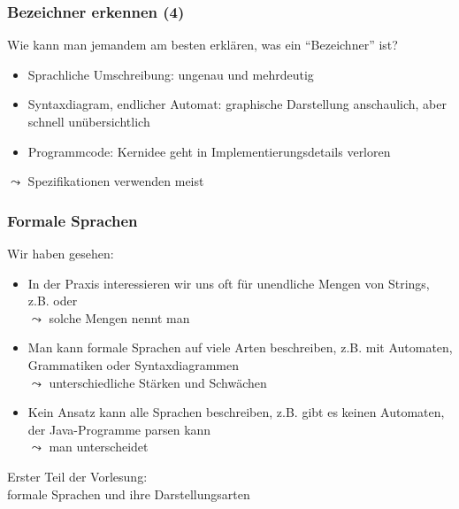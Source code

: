 \documentclass[onlymath]{beamer}
\begin{document}
\begin{frame}\frametitle{Bezeichner erkennen (4)}

Wie kann man jemandem am besten erklären, was ein "`Bezeichner"' ist?
\begin{itemize}
\item \alert{Sprachliche Umschreibung}: ungenau und mehrdeutig
\item \alert{Syntaxdiagram}, \alert{endlicher Automat}: graphische Darstellung anschaulich, aber schnell unübersichtlich
\item \alert{Programmcode}: Kernidee geht in Implementierungsdetails verloren
\end{itemize}
$\leadsto$ Spezifikationen verwenden meist 


\end{frame}

\begin{frame}\frametitle{Formale Sprachen}

Wir haben gesehen:
\begin{itemize}
\item In der Praxis interessieren wir uns oft für unendliche Mengen von Strings, z.B.  oder \\
$\leadsto$ solche Mengen nennt man 
\item Man kann formale Sprachen auf viele Arten beschreiben, z.B. mit Automaten, Grammatiken oder Syntaxdiagrammen\\
$\leadsto$ unterschiedliche Stärken und Schwächen
\item Kein Ansatz kann alle Sprachen beschreiben, z.B. gibt es keinen Automaten, der Java-Programme parsen kann\\
$\leadsto$ man unterscheidet 
\end{itemize}

Erster Teil der Vorlesung:\\
formale Sprachen und ihre Darstellungsarten

\end{frame}
\end{document}
